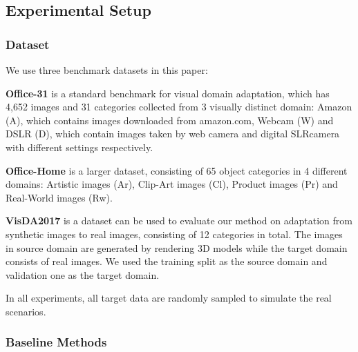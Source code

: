 \newcommand\emmax[1]{\textcolor{red}{\textbf{#1}}}
\newcommand\methodyear[1]{\textcolor{blue}{#1}}
\newcommand\Tstrut{\rule{0pt}{2.6ex}}
\newcommand\Bstrut{\rule[-0.9ex]{0pt}{0pt}}




\subsection{Experimental Setup}

\subsubsection{Dataset}
We use three benchmark datasets in this paper:

\textbf{Office-31} \cite{Office-31} is a standard benchmark for visual domain adaptation, which has 4,652 images and 31 categories collected from 3 visually distinct domain: Amazon (A), which contains images downloaded from amazon.com, Webcam (W) and DSLR (D), which contain images taken by web camera and digital SLRcamera with different settings respectively. 

\textbf{Office-Home} \cite{Office-Home} is a larger dataset, consisting of 65 object categories in 4 different domains: Artistic images (Ar), Clip-Art images (Cl), Product images (Pr) and Real-World images (Rw). 

\textbf{VisDA2017} \cite{VisDA} is a dataset can be used to evaluate our method on adaptation from synthetic images to real images, consisting of 12 categories in total. The images in source domain are generated by rendering 3D models while the target domain consists of real images. We used the training split as the source domain and validation one as the target domain. 

In all experiments, all target data are randomly sampled to simulate the real scenarios. 




\subsubsection{Baseline Methods}



